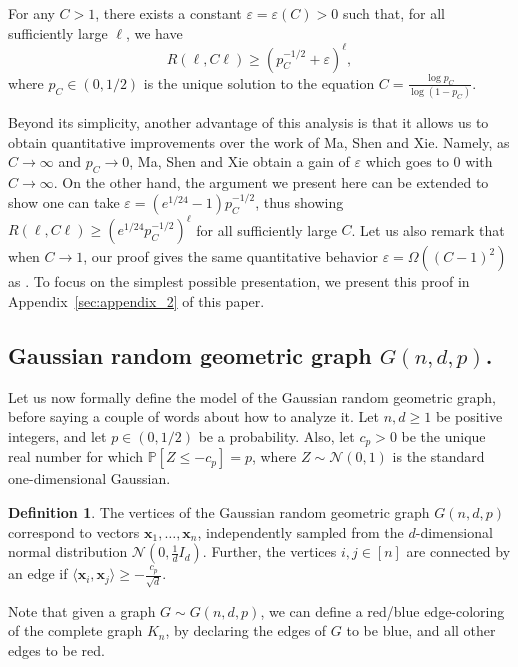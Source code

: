 \documentclass[11pt]{amsart}
\theoremstyle{definition}
\newtheorem{definition}[theorem]{\bf Definition}
\def\eps{\varepsilon}
\def\cN{\mathcal{N}}
\def\Pb{\mathbb{P}}
\def\bx{\boldsymbol{x}}
\begin{document}
\begin{theorem}\label{thm:main}
For any $C>1$, there exists a constant $\eps=\eps(C)>0$ such that, for all sufficiently large $\ell$, we have
{\smaller[0.3]
\[R(\ell, C\ell)\geq (p_C^{-1/2}+\eps)^\ell,\]
}
where $p_C\in (0, 1/2)$ is the unique solution to the equation $C=\frac{\log p_C}{\log (1-p_C)}$.
\end{theorem}

Beyond its simplicity, another advantage of this analysis is that it allows us to obtain quantitative improvements over the work of Ma, Shen and Xie. Namely, as $C\to \infty$ and $p_C\to 0$, Ma, Shen and Xie obtain a gain of $\eps$ which goes to $0$ with $C\to \infty$. On the other hand, the argument we present here can be extended to show one can take $\eps=(e^{1/24}-1)p_C^{-1/2}$, thus showing $R(\ell, C\ell)\geq (e^{1/24}p_C^{-1/2})^\ell$ for all sufficiently large $C$. Let us also remark that when $C\to 1$, our proof gives the same quantitative behavior $\eps=\Omega((C-1)^2)$ as \cite{MSX25}. 
To focus on the simplest possible presentation, we present this proof in Appendix~\ref{sec:appendix_2} of this paper.%

\subsection{Gaussian random geometric graph \texorpdfstring{$G(n, d, p)$}{G(n,d,p)}.}

Let us now formally define the model of the Gaussian random geometric graph, before saying a couple of words about how to analyze it. Let $n, d\geq 1$ be positive integers, and let $p\in (0, 1/2)$ be a probability. Also, let $c_p>0$ be the unique real number for which $\Pb[Z\leq -c_p]=p$, where $Z\sim \cN(0, 1)$ is the standard one-dimensional Gaussian.

\begin{definition}\label{def:RGG}
The vertices of the Gaussian random geometric graph $G(n, d, p)$ correspond to vectors $\bx_1, \dots, \bx_n$, independently sampled from the $d$-dimensional normal distribution $\cN(0, \frac{1}{d}I_d)$. Further, the vertices $i, j\in [n]$ are connected by an edge if $\langle \bx_i, \bx_j\rangle\geq -\frac{c_p}{\sqrt{d}}$.
\end{definition}

Note that given a graph $G\sim G(n, d, p)$, we can define a red/blue edge-coloring of the complete graph $K_n$, by declaring the edges of $G$ to be blue, and all other edges to be red.
\end{document}
